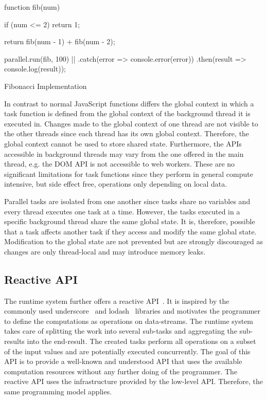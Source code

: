\begin{listing}
	\begin{javascriptcode}
function fib(num) {
	if (num <= 2) {
    	return 1;
	}

	return fib(num - 1) + fib(num - 2);
}
        
parallel.run(fib, 100) |$\label{code:parallel-run}$|
	.catch(error => console.error(error))
	.then(result => console.log(result));	
	\end{javascriptcode}

	\caption{Fibonacci Implementation}
	\label{fig:fibonacci-implementation}
\end{listing}

In contrast to normal JavaScript functions differs the global context in which a task function is defined from the global context of the background thread it is executed in. Changes made to the global context of one thread are not visible to the other threads since each thread has its own global context. Therefore, the global context cannot be used to store shared state. Furthermore, the APIs accessible in background threads may vary from the one offered in the main thread, e.g. the DOM API is not accessible to web workers. These are no significant limitations for task functions since they perform in general compute intensive, but side effect free, operations only depending on local data.

Parallel tasks are isolated from one another since tasks share no variables and every thread executes one task at a time. However, the tasks executed in a specific background thread share the same global state. It is, therefore, possible that a task affects another task if they access and modify the same global state. Modification to the global state are not prevented but are strongly discouraged as changes are only thread-local and may introduce memory leaks. 

\subsection{Reactive API}
The runtime system further offers a reactive API~\cite{Meijer2012}. It is inspired by the commonly used underscore~\cite{underscorejs} and lodash~\cite{lodash} libraries and motivates the programmer to define the computations as operations on data-streams. The runtime system takes care of splitting the work into several sub-tasks and aggregating the sub-results into the end-result. The created tasks perform all operations on a subset of the input values and are potentially executed concurrently. The goal of this API is to provide a well-known and understood API that uses the available computation resources without any further doing of the programmer. The reactive API uses the infrastructure provided by the low-level API. Therefore, the same programming model applies.


